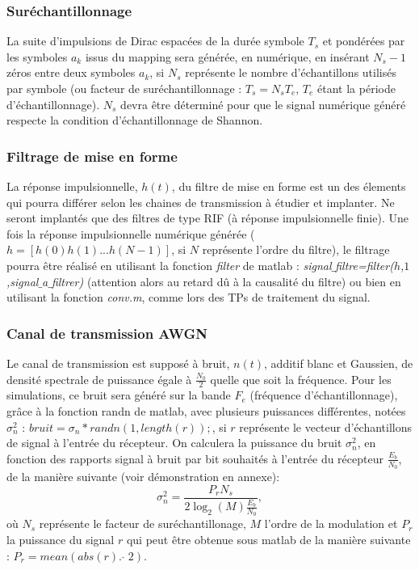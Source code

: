 \documentclass[frenchb]{article}
\begin{document}
\subsubsection{Suréchantillonnage}
La suite d'impulsions de Dirac espacées de la durée symbole $T_s$ et pondérées par les symboles $a_k$ issus du mapping sera générée, en numérique, en insérant $N_s-1$ zéros entre deux symboles $a_k$, si $N_s$ représente le nombre d'échantillons utilisés par symbole (ou facteur de suréchantillonnage : $T_s=N_sT_e$, $T_e$ étant la période d'échantillonnage). $N_s$ devra être déterminé pour que le signal numérique généré respecte la condition d'échantillonnage de Shannon.

\subsubsection{Filtrage de mise en forme}
La réponse impulsionnelle, $h(t)$, du filtre de mise en forme est un des élements qui pourra différer selon les chaines de transmission à étudier et implanter. Ne seront implantés que des filtres de type RIF (à réponse impulsionnelle finie). Une fois la réponse impulsionnelle numérique générée ($h=\left[h(0) h(1) ... h(N-1)\right]$, si $N$ représente l'ordre du filtre), le filtrage pourra être réalisé en utilisant la fonction \emph{filter} de matlab : \emph{signal$\_$filtre=filter($h$,$1$,signal$\_$a$\_$filtrer)} (attention alors au retard dû à la causalité du filtre) ou bien en utilisant la fonction \emph{conv.m}, comme lors des TPs de traitement du signal.

\subsubsection{Canal de transmission AWGN}
Le canal de transmission est supposé à bruit, $n(t)$, additif blanc et Gaussien, de densité spectrale de puissance égale à $\frac{N_0}{2}$ quelle que soit la fréquence. Pour les simulations, ce bruit sera généré sur la bande $F_e$ (fréquence d'échantillonnage), grâce à la fonction randn de matlab, avec plusieurs puissances différentes, notées $\sigma_n^2$ : $bruit=\sigma_n \ast randn(1,length(r));$, si $r$ représente le vecteur d'échantillons de signal à l'entrée du récepteur. On calculera la puissance du bruit $\sigma_n^2$, en fonction des rapports signal à bruit par bit souhaités à l'entrée du récepteur $\frac{E_b}{N_0}$, de la manière suivante (voir démonstration en annexe):
$$
\sigma_n^2=\frac{P_r N_s}{2 \log_2(M) \frac{E_b}{N_0}},
$$
où $N_s$ représente le facteur de suréchantillonage, $M$ l'ordre de la modulation et $P_r$ la puissance du signal $r$ qui peut être obtenue sous matlab de la manière suivante : $P_r=mean(abs(r). \; \hat{ }\;2)$.
\end{document}
